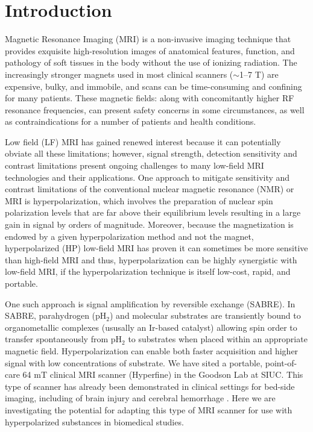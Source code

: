 \documentclass[final,3p,times,twocolumn]{elsarticle}
\begin{document}



\section{Introduction}
Magnetic Resonance Imaging (MRI) is a non-invasive imaging technique that provides exquisite high-resolution images of anatomical features, function, and pathology of soft tissues in the body without the use of ionizing radiation. The increasingly stronger magnets used in most clinical scanners ($\sim$1–7 T) are expensive, bulky, and immobile, and scans can be time-consuming and confining for many patients.  These  magnetic fields: along with concomitantly higher RF resonance frequencies, can present safety concerns in some circumstances, as well as contraindications for a number of patients and health conditions. 
\par Low field (LF) MRI\cite{blanchard2021lower}\cite{coffey2013low}\cite{coffey2014high}\cite{barskiy2014situ}\cite{lehmkuhl2020sabre} has gained renewed interest because it can potentially obviate all these limitations; however, signal strength, detection sensitivity and contrast limitations present ongoing challenges to many low-field MRI technologies and their applications. One approach to mitigate sensitivity and contrast limitations of the conventional nuclear magnetic resonance (NMR) or MRI is hyperpolarization, which involves the preparation of nuclear spin polarization levels that are far above their equilibrium levels resulting in a large gain in signal \cite{lehmkuhl2020sabre}\cite{nikolaou2015nmr} by orders of magnitude. Moreover, because the magnetization is endowed by a given hyperpolarization method and not the magnet, hyperpolarized (HP) low-field MRI has proven it can sometimes be more sensitive than high-field MRI\cite{coffey2013low} and thus, hyperpolarization can be highly synergistic with low-field MRI, if the hyperpolarization technique is itself low-cost, rapid, and portable\cite{barskiy2014situ}\cite{lehmkuhl2020sabre}\cite{nikolaou2015nmr}. 
\par One such approach is signal amplification by reversible exchange (SABRE)\cite{adams2009reversible}. In SABRE, parahydrogen (pH$_{\mathrm{2}}$) and molecular substrates are transiently bound to organometallic complexes (ususally an Ir-based catalyst) allowing spin order to transfer spontaneously from pH$_{\mathrm{2}}$ to substrates when placed within an appropriate magnetic field. Hyperpolarization can enable both faster acquisition and higher signal with low concentrations of substrate. We have sited a portable, point-of-care 64 mT clinical MRI scanner (Hyperfine) in the Goodson Lab at SIUC. This type of scanner has already been demonstrated in clinical settings for bed-side imaging, including of brain injury and cerebral hemorrhage \cite{sheth2020first}\cite{mazurek2021portable}. Here we are investigating the potential for adapting this type of MRI scanner for use with hyperpolarized substances in biomedical studies. 
\end{document}

